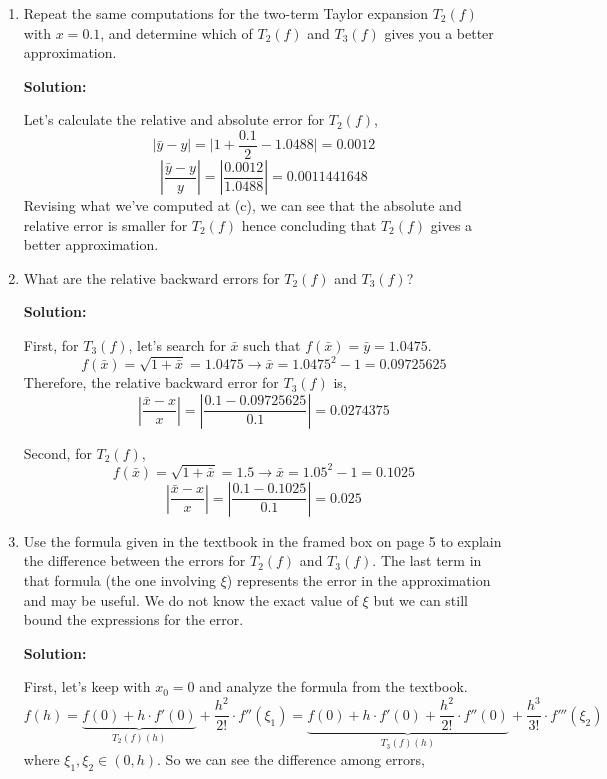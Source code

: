 \documentclass[11pt]{article}
\newenvironment{solution}
  {\par\noindent\textbf{Solution:}\par}
  {\par}
\begin{document}
\begin{enumerate}
\begin{enumerate}
\item Repeat the same computations for the two-term Taylor expansion $T_2(f)$ with $x=0.1$, and determine which of $T_2(f)$ and $T_3(f)$ gives you a better approximation. 
  \begin{solution}
    Let's calculate the relative and absolute error for $T_2(f)$,
    $$\vert \bar{y} - y \vert = \vert 1 + \frac{0.1}{2} - 1.0488 \vert=0.0012$$
    $$\left| \frac{\bar{y} - y}{y} \right| = \left| \frac{0.0012}{1.0488} \right| = 0.0011441648$$
    Revising what we've computed at (c), we can see that the absolute and relative error is smaller for $T_2(f)$ hence concluding that $T_2(f)$ gives a better approximation. 
  \end{solution}

\item What are the relative backward errors  for $T_2(f)$ and $T_3(f)$?

  \begin{solution}
    First, for $T_3(f)$, let's search for $\bar{x}$ such that $f(\bar{x})=\bar{y}=1.0475$.
    $$f(\bar{x})=\sqrt{1+\bar{x}} = 1.0475 \to \bar{x} = 1.0475^2-1 = 0.09725625$$
    Therefore, the relative backward error for $T_3(f)$ is, 
    $$\left| \frac{\bar{x} - x}{x} \right| = \left| \frac{0.1 - 0.09725625}{0.1} \right| = 0.0274375$$

    Second, for $T_2(f)$,
    $$f(\bar{x}) = \sqrt{1+\bar{x}} = 1.5 \to \bar{x} = 1.05^2 - 1 = 0.1025$$
    $$\left| \frac{\bar{x} - x}{x} \right| = \left| \frac{0.1-0.1025}{0.1} \right| = 0.025$$

    
  
  \end{solution}

\item Use the formula given in the textbook in the framed box on page 5 to explain the difference between the errors for $T_2(f)$ and $T_3(f)$. The last term in that formula (the one involving $\xi$) represents the error in the approximation and may be useful. We do not know the exact value of $\xi$ but we can still bound the expressions for the error.
  \begin{solution}
    First, let's keep with $x_0 = 0$ and analyze the formula from the textbook. 
    $$f(h) = \underbrace{f(0) + h\cdot f'(0)}_{T_2(f)(h)} + \frac{h^2}{2!}\cdot f''(\xi_1) 
    = \underbrace{f(0) + h\cdot f'(0) + \frac{h^2}{2!}\cdot f''(0)}_{T_3(f)(h)} + \frac{h^3}{3!}\cdot f'''(\xi_2)$$
  where $\xi_1,\xi_2 \in (0,h)$.
   So we can see the difference among errors,
  \end{solution}



\end{enumerate}
\end{enumerate}
\end{document}
